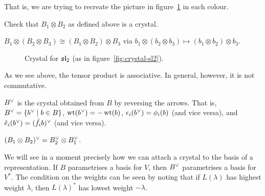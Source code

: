 That is, we are trying to recreate the picture in figure~\ref{fig:crystal-sl2-again}
in each colour.

\begin{exercise}
Check that $B_1 \otimes B_2$ as defined above is a crystal.
\end{exercise}

\begin{exercise}
$B_1 \otimes (B_2 \otimes B_3) \cong (B_1 \otimes B_2) \otimes B_3$ via
$b_1 \otimes (b_2 \otimes b_3) \mapsto (b_1 \otimes b_2) \otimes b_3$.
\end{exercise}

\begin{figure}[!htbp]
  \centering
  \slcrystal
  \caption{Crystal for $\sl_2$ (as in figure~\ref{fig:crystal-sl2}).}
  \label{fig:crystal-sl2-again}
\end{figure}

\begin{remark}
As we see above, the tensor product is associative. In general, however, it is
not commutative.
\end{remark}

\begin{definition}
$B\cv$ is the crystal obtained from $B$ by reversing the arrows. That is,
$B\cv = \setc{b\cv}{b \in B}$, $\wt(b\cv) = -\wt(b)$,
$\epsilon_i(b\cv) = \phi_i(b)$ (and vice versa), and
$\te_i(b\cv) = (\tf_ib)\cv$ (and vice versa).
\end{definition}

\begin{exercise}
$(B_1 \otimes B_2)\cv = B_2\cv \otimes B_1\cv$.
\end{exercise}

\begin{remark}
We will see in a moment precisely how we can attach a crystal to the basis of a
representation. If $B$ parametrises a basis for $V$, then $B\cv$ parametrises a
basis for $V^*$. The condition on the weights can be seen by noting that if
$L(\lambda)$ has highest weight $\lambda$, then $L(\lambda)^*$ has lowest
weight $-\lambda$.
\end{remark}

